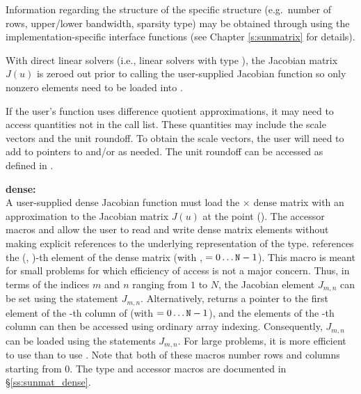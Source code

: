 {
  Information regarding the structure of the specific {\sunmatrix}
  structure (e.g.~number of rows, upper/lower bandwidth, sparsity
  type) may be obtained through using the implementation-specific
  {\sunmatrix} interface functions (see Chapter \ref{s:sunmatrix} for
  details).

  With direct linear solvers (i.e., linear solvers with type
  ), the Jacobian matrix $J(u)$ is zeroed out prior
  to calling the user-supplied Jacobian function so only nonzero elements need
  to be loaded into .

  If the user's  function uses difference quotient
  approximations, it may need to access quantities not in the call list.
  These quantities may include the scale vectors and the unit roundoff.
  To obtain the scale vectors, the user will need to add to 
  pointers to  and/or  as needed.
  The unit roundoff can be accessed as  defined in
  .

  {\bf dense:}\\
  A user-supplied dense Jacobian function must load the  $\times$ 
  dense matrix  with an approximation to the Jacobian matrix $J(u)$
  at the point ().  The accessor macros 
  and  allow the user to read and write dense matrix
  elements without making explicit references to the underlying
  representation of the {\sunmatdense} type.
   references the (, )-th
  element of the dense matrix  (with , $= 0\ldots
  {\tt N}-1$). This macro is meant for small problems for which efficiency
  of access is not a major concern.  Thus, in terms of the indices $m$
  and $n$ ranging from $1$ to $N$, the Jacobian element $J_{m,n}$ can
  be set using the statement 
  $J_{m,n}$.  Alternatively,  returns a
  pointer to the first element of the -th column of 
  (with $= 0\ldots {\tt N}-1$), and the elements of the -th column
  can then be accessed using ordinary array indexing.  Consequently,
  $J_{m,n}$ can be loaded using the statements
    $J_{m,n}$.
  For large problems, it is more efficient to use 
  than to use .  Note that both of these macros
  number rows and columns starting from $0$.  The {\sunmatdense} type
  and accessor macros are documented in \S\ref{ss:sunmat_dense}.

}
